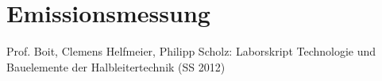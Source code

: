 \section{Emissionsmessung}
\begin{quote}

\end{quote} %

\newpage

\begin{thebibliography}{999}




 Prof. Boit, Clemens Helfmeier, Philipp Scholz: Laborskript Technologie und Bauelemente der
Halbleitertechnik (SS 2012)
\end{thebibliography}


